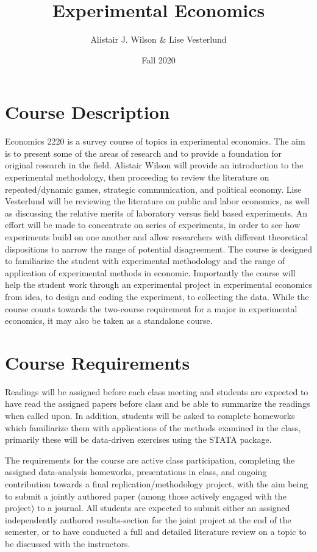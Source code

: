 \documentclass[11pt,english]{article}
\begin{document}
\title{Experimental Economics}
\author{Alistair J. Wilson \& Lise Vesterlund}
\date{Fall 2020}
\maketitle

\section*{Course Description}

Economics 2220 is a survey course of topics in experimental economics. The aim is to present some of the areas of research and to provide a foundation for original research in the field. Alistair Wilson will provide an introduction to the experimental methodology, then proceeding to review the literature on repeated/dynamic games, strategic communication, and political economy. Lise Vesterlund will be reviewing the literature on public and labor economics, as well as discussing the relative merits of laboratory versus field based experiments. An effort will be made to concentrate on series of experiments, in order to see how experiments build on one another and allow researchers with different theoretical dispositions to narrow the range of potential disagreement. The course is designed to familiarize the student with experimental methodology and the range of application of experimental methods in economic. Importantly the course will help the student work through an experimental project in experimental economics from idea, to design and coding the experiment, to collecting the data. While the course counts towards the two-course requirement for a major in experimental economics, it may also be taken as a standalone course.

\section*{Course Requirements}
Readings will be assigned before each class meeting and students are expected to have read the assigned papers before class and be able to summarize the readings when called upon. In addition, students will be asked to complete homeworks which familiarize them with applications of the methods examined in the class, primarily these will be data-driven exercises using the STATA package. 

The requirements for the course are active class participation, completing the assigned data-analysis homeworks, presentations in class, and ongoing contribution towards a final replication/methodology project, with the aim being to submit a jointly authored paper (among those actively engaged with the project) to a journal. All students are expected to submit either an assigned independently authored results-section for the joint project at the end of the semester, or to have conducted a full and detailed literature review on a topic to be discussed with the instructors.
\end{document}
